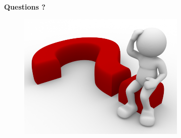 \documentclass[]{beamer}
\begin{document}
\begin{frame}
\begin{center}
\huge{\textbf{Questions ?}}
\end{center}
\begin{figure}
   \centering
   \includegraphics[width=8cm]{pictures/questions.png}
\end{figure}
\end{frame}
\end{document}

